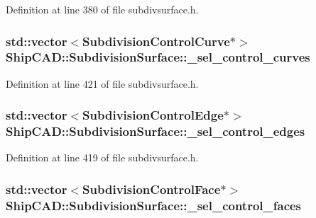 Definition at line 380 of file subdivsurface.\-h.

\hypertarget{classShipCAD_1_1SubdivisionSurface_aeac6a33f098ee8dadfc9482edc1a60a5}{
\subsubsection[{\-\_\-sel\-\_\-control\-\_\-curves}]{\setlength{\rightskip}{0pt plus 5cm}std\-::vector$<${\bf Subdivision\-Control\-Curve}$\ast$$>$ Ship\-C\-A\-D\-::\-Subdivision\-Surface\-::\-\_\-sel\-\_\-control\-\_\-curves\hspace{0.3cm}{\ttfamily [protected]}}}\label{classShipCAD_1_1SubdivisionSurface_aeac6a33f098ee8dadfc9482edc1a60a5}


Definition at line 421 of file subdivsurface.\-h.

\hypertarget{classShipCAD_1_1SubdivisionSurface_a27011a827021fda5a4f2bb8828e157ca}{
\subsubsection[{\-\_\-sel\-\_\-control\-\_\-edges}]{\setlength{\rightskip}{0pt plus 5cm}std\-::vector$<${\bf Subdivision\-Control\-Edge}$\ast$$>$ Ship\-C\-A\-D\-::\-Subdivision\-Surface\-::\-\_\-sel\-\_\-control\-\_\-edges\hspace{0.3cm}{\ttfamily [protected]}}}\label{classShipCAD_1_1SubdivisionSurface_a27011a827021fda5a4f2bb8828e157ca}


Definition at line 419 of file subdivsurface.\-h.

\hypertarget{classShipCAD_1_1SubdivisionSurface_a612889fd7e746cca042c63b2ab2cd110}{
\subsubsection[{\-\_\-sel\-\_\-control\-\_\-faces}]{\setlength{\rightskip}{0pt plus 5cm}std\-::vector$<${\bf Subdivision\-Control\-Face}$\ast$$>$ Ship\-C\-A\-D\-::\-Subdivision\-Surface\-::\-\_\-sel\-\_\-control\-\_\-faces\hspace{0.3cm}{\ttfamily [protected]}}}\label{classShipCAD_1_1SubdivisionSurface_a612889fd7e746cca042c63b2ab2cd110}


